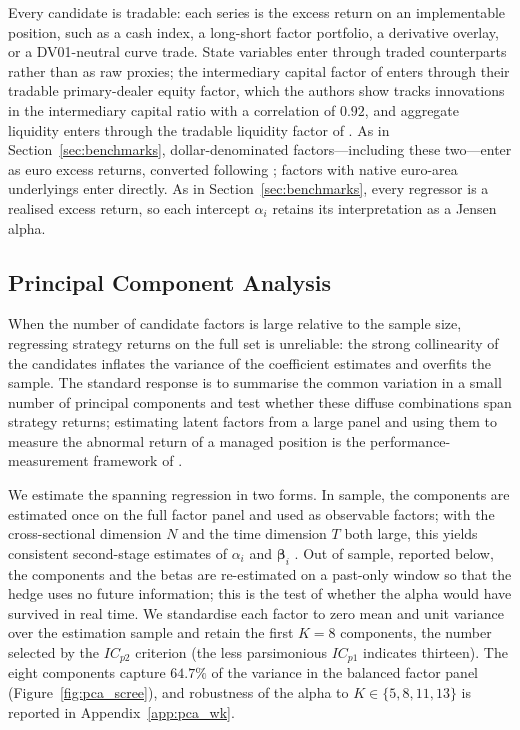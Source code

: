 Every candidate is tradable: each series is the excess return on an
implementable position, such as a cash index, a long-short factor
portfolio, a derivative overlay, or a DV01-neutral curve trade. State variables
enter through traded counterparts rather than as raw proxies; the
intermediary capital factor of \citet{he2017intermediary} enters
through their tradable primary-dealer equity factor, which the authors
show tracks innovations in the intermediary capital ratio with a
correlation of $0.92$, and aggregate liquidity enters through the
tradable liquidity factor of \citet{pastor2003liquidity}. As in
Section~\ref{sec:benchmarks}, dollar-denominated factors---including
these two---enter as euro excess returns, converted following
\citet{gluck2021currency}; factors with native euro-area underlyings
enter directly. As in Section~\ref{sec:benchmarks}, every regressor is a realised
excess return, so each intercept $\alpha_i$ retains its interpretation
as a Jensen alpha.



\subsection{Principal Component Analysis}
\label{sec:pca}

When the number of candidate factors is large relative to the sample
size, regressing strategy returns on the full set is unreliable: the
strong collinearity of the candidates inflates the variance of the
coefficient estimates and overfits the sample. The standard response
is to summarise the common variation in a small number of principal
components and test whether these diffuse combinations span strategy
returns; estimating latent factors from a large panel and using them
to measure the abnormal return of a managed position is the
performance-measurement framework of \citet{connor1986performance,
connor1988risk}.

We estimate the spanning regression in two forms. In sample, the
components are estimated once on the full factor panel and used as
observable factors; with the cross-sectional dimension $N$ and the
time dimension $T$ both large, this yields consistent second-stage
estimates of $\alpha_i$ and $\boldsymbol{\beta}_i$
\citep{giglio2021asset}. Out of sample, reported below, the components
and the betas are re-estimated on a past-only window so that the hedge
uses no future information; this is the test of whether the alpha
would have survived in real time. We
standardise each factor to zero mean and unit variance over the
estimation sample and retain the first $K = 8$ components, the number
selected by the \citet{bai2002determining} $IC_{p2}$ criterion (the
less parsimonious $IC_{p1}$ indicates thirteen). The eight components
capture $64.7\%$ of the variance in the balanced factor panel
(Figure~\ref{fig:pca_scree}), and robustness of the alpha to
$K \in \{5, 8, 11, 13\}$ is reported in Appendix~\ref{app:pca_wk}.

